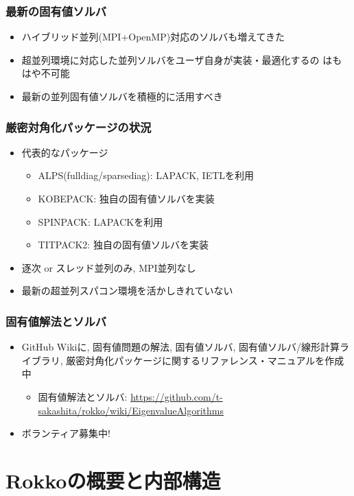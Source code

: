 \begin{frame}
  \frametitle{最新の固有値ソルバ}
  \begin{itemize}
    \setlength{\itemsep}{1em}
  \item ハイブリッド並列(MPI+OpenMP)対応のソルバも増えてきた
  \item 超並列環境に対応した並列ソルバをユーザ自身が実装・最適化するの
    はもはや不可能
  \item 最新の並列固有値ソルバを積極的に活用すべき
  \end{itemize}
\end{frame}

\begin{frame}
  \frametitle{厳密対角化パッケージの状況}
  \begin{itemize}
    \setlength{\itemsep}{1em}
  \item 代表的なパッケージ
    \begin{itemize}
    \item ALPS(fulldiag/sparsediag): LAPACK, IETLを利用
    \item KOBEPACK: 独自の固有値ソルバを実装
    \item SPINPACK: LAPACKを利用
    \item TITPACK2: 独自の固有値ソルバを実装
    \end{itemize}
  \item 逐次 or スレッド並列のみ, MPI並列なし
  \item 最新の超並列スパコン環境を活かしきれていない
  \end{itemize}
\end{frame}

\begin{frame}
  \frametitle{固有値解法とソルバ}
  \begin{itemize}
    \setlength{\itemsep}{1em}
    \item GitHub Wikiに, 固有値問題の解法, 固有値ソルバ, 固有値ソルバ/線形計算ライブラリ, 厳密対角化パッケージに関するリファレンス・マニュアルを作成中
      \begin{itemize}
        \item 固有値解法とソルバ: \url{https://github.com/t-sakashita/rokko/wiki/EigenvalueAlgorithms}
      \end{itemize}
    \item ボランティア募集中!
  \end{itemize}
\end{frame}
        
\section{Rokkoの概要と内部構造}

